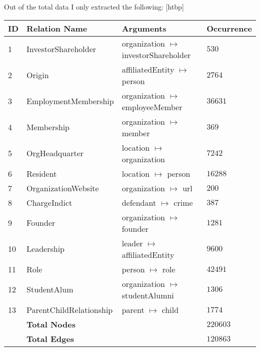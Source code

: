 \documentclass{tufte-handout}
\makeatletter
\renewenvironment{table}[1][htbp]{%
\@tufte@orig@float{table}[#1]}{%
\@tufte@orig@endfloat}%
\makeatother
\begin{document}
Out of the total data I only extracted the following:
\begin{table}[htbp]
  \centering
  \begin{tabular}{l l l l }
    \textbf{ID} & \textbf{Relation Name}  & \textbf{Arguments}                         & \textbf{Occurrence} \\\toprule
    1           & InvestorShareholder     & organization $\mapsto$ investorShareholder & $530$               \\
    2           & Origin                  & affiliatedEntity $\mapsto$ person          & $2764$              \\
    3           & EmploymentMembership    & organization $\mapsto$ employeeMember      & $36631$             \\
    4           & Membership              & organization $\mapsto$ member              & $369$               \\
    5           & OrgHeadquarter          & location $\mapsto$ organization            & $7242$              \\
    6           & Resident                & location $\mapsto$ person                  & $16288$             \\
    7           & OrganizationWebsite     & organization $\mapsto$ url                 & $200$               \\
    8           & ChargeIndict            & defendant $\mapsto$ crime                  & $387$               \\
    9           & Founder                 & organization $\mapsto$ founder             & $1281$              \\
    10          & Leadership              & leader $\mapsto$ affiliatedEntity          & $9600$              \\
    11          & Role                    & person $\mapsto$ role                      & $42491$             \\
    12          & StudentAlum             & organization $\mapsto$ studentAlumni       & $1306$              \\
    13          & ParentChildRelationship & parent $\mapsto$ child                     & $1774$              \\\midrule
                & \textbf{Total Nodes}          &                                            & $220603$ \\
                & \textbf{Total Edges}          &                                            & $120863$ \\\bottomrule
  \end{tabular}
  \caption{Extracted Nodes Summary}
  \label{tab:extraction-summary}
\end{table}
\end{document}

